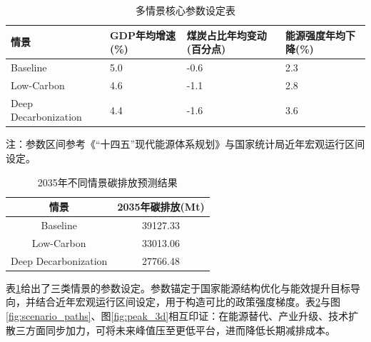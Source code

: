 \begin{table}[H]
\centering
\caption{多情景核心参数设定表}
\label{tab:scenario_params}
\small 
\begin{tabularx}{\textwidth}{lXXX} 
\toprule
情景 & GDP年均增速(\%) & 煤炭占比年均变动(百分点) & 能源强度年均下降(\%) \\
\midrule
Baseline & 5.0 & -0.6 & 2.3 \\
Low-Carbon & 4.6 & -1.1 & 2.8 \\
Deep Decarbonization & 4.4 & -1.6 & 3.6 \\
\bottomrule
\end{tabularx}

{\footnotesize 注：参数区间参考《“十四五”现代能源体系规划》与国家统计局近年宏观运行区间设定。}
\end{table}

\begin{table}[H]
\centering
\caption{2035年不同情景碳排放预测结果}
\label{tab:scenario_2035}
\begin{tabular}{cc}
\toprule
情景 & 2035年碳排放(Mt) \\
\midrule
Baseline & 39127.33 \\
Low-Carbon & 33013.06 \\
Deep Decarbonization & 27766.48 \\
\bottomrule
\end{tabular}
\end{table}

表\ref{tab:scenario_params}给出了三类情景的参数设定。参数锚定于国家能源结构优化与能效提升目标导向，并结合近年宏观运行区间设定，用于构造可比的政策强度梯度。表\ref{tab:scenario_2035}与图\ref{fig:scenario_paths}、图\ref{fig:peak_3d}相互印证：在能源替代、产业升级、技术扩散三方面同步加力，可将未来峰值压至更低平台，进而降低长期减排成本。

